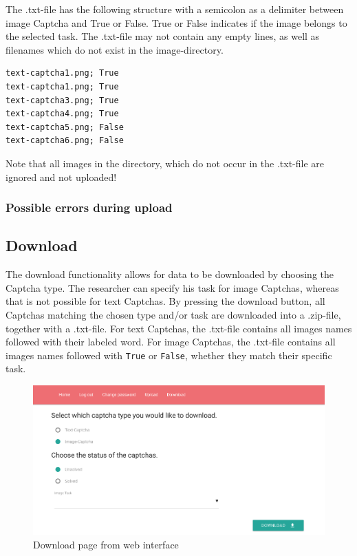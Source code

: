 The .txt-file has the following structure with a semicolon as a delimiter between image Captcha and True or False. True or False indicates if the image belongs to the selected task. The .txt-file may not contain any empty lines, as well as filenames which do not exist in the image-directory.

\begin{lstlisting}
text-captcha1.png; True
text-captcha1.png; True
text-captcha3.png; True
text-captcha4.png; True
text-captcha5.png; False
text-captcha6.png; False
\end{lstlisting}

Note that all images in the directory, which do not occur in the .txt-file are ignored and not uploaded!

\clearpage
\subsubsection{Possible errors during upload}

\clearpage
\subsection{Download}

The download functionality allows for data to be downloaded by choosing the Captcha type. The researcher can specify his task for image Captchas, whereas that is not possible for text Captchas. By pressing the download button, all Captchas matching the chosen type and/or task are downloaded into a .zip-file, together with a .txt-file. For text Captchas, the .txt-file contains all images names followed with their labeled word. For image Captchas, the .txt-file contains all images names followed with \verb|True| or \verb|False|, whether they match their specific task.
\begin{figure}[H]
\centering
\includegraphics[width=1\linewidth]{content/figures/download.png}
\caption{Download page from web interface}
\label{fig:download}
\end{figure}

